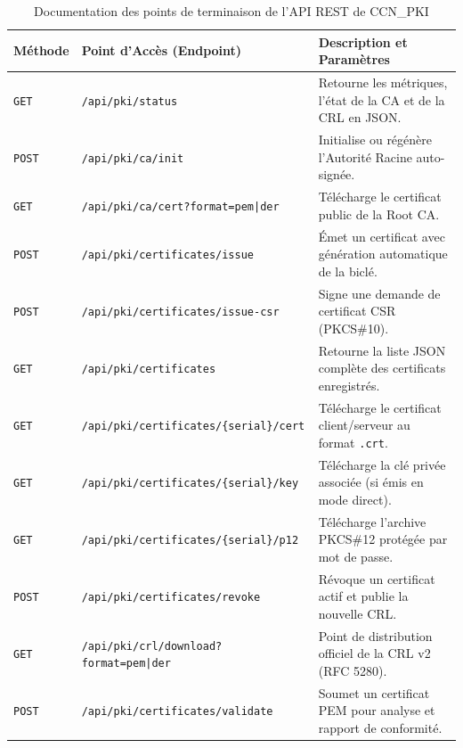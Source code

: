 \documentclass[12pt,a4paper]{report}
\begin{document}
\begin{table}[H]
\centering
\small
\begin{tabularx}{\textwidth}{l l X}
\toprule
\textbf{Méthode} & \textbf{Point d'Accès (Endpoint)} & \textbf{Description et Paramètres} \\
\midrule
\texttt{GET} & \texttt{/api/pki/status} & Retourne les métriques, l'état de la CA et de la CRL en JSON. \\
\addlinespace
\texttt{POST} & \texttt{/api/pki/ca/init} & Initialise ou régénère l'Autorité Racine auto-signée. \\
\addlinespace
\texttt{GET} & \texttt{/api/pki/ca/cert?format=pem|der} & Télécharge le certificat public de la Root CA. \\
\addlinespace
\texttt{POST} & \texttt{/api/pki/certificates/issue} & Émet un certificat avec génération automatique de la biclé. \\
\addlinespace
\texttt{POST} & \texttt{/api/pki/certificates/issue-csr} & Signe une demande de certificat CSR (PKCS\#10). \\
\addlinespace
\texttt{GET} & \texttt{/api/pki/certificates} & Retourne la liste JSON complète des certificats enregistrés. \\
\addlinespace
\texttt{GET} & \texttt{/api/pki/certificates/\{serial\}/cert} & Télécharge le certificat client/serveur au format \texttt{.crt}. \\
\addlinespace
\texttt{GET} & \texttt{/api/pki/certificates/\{serial\}/key} & Télécharge la clé privée associée (si émis en mode direct). \\
\addlinespace
\texttt{GET} & \texttt{/api/pki/certificates/\{serial\}/p12} & Télécharge l'archive PKCS\#12 protégée par mot de passe. \\
\addlinespace
\texttt{POST} & \texttt{/api/pki/certificates/revoke} & Révoque un certificat actif et publie la nouvelle CRL. \\
\addlinespace
\texttt{GET} & \texttt{/api/pki/crl/download?format=pem|der} & Point de distribution officiel de la CRL v2 (RFC 5280). \\
\addlinespace
\texttt{POST} & \texttt{/api/pki/certificates/validate} & Soumet un certificat PEM pour analyse et rapport de conformité. \\
\bottomrule
\end{tabularx}
\caption{Documentation des points de terminaison de l'API REST de CCN\_PKI}
\label{tab:api_endpoints}
\end{table}

\end{document}
